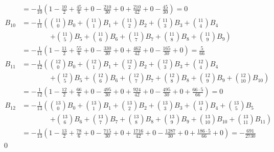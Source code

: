\documentclass[10pt]{amsart}
\theoremstyle{nonumberplain}
\begin{document}
\begin{enumerate}[label={\bf {\arabic*}:}]
\begin{enumerate}
\begin{align*}
	&= - \frac 1 {10} \left( 1 - \frac {10} 2 + \frac {45} 6 + 0 - \frac {210} {30} + 0 + \frac {210}{42} + 0 - \frac {45}{30} \right)
	= 0 \\
B_{10} &= - \frac 1 {11} \left(
		{11 \choose 0}B_0
		+  {11 \choose 1}B_1
		+ {11 \choose 2}B_2
		+ {11 \choose 3}B_3
		+ {11 \choose 4}B_4 \right. \\
		& \quad\quad\quad\quad\left. + {11 \choose 5}B_5
		+ {11 \choose 6}B_6
		+ {11 \choose 7}B_7
		+ {11 \choose 8}B_8
		+ {11 \choose 9}B_9
	\right) \\
	&= - \frac 1 {11} \left( 1 - \frac {11} 2 + \frac {55} 6 + 0 - \frac {330} {30} + 0 + \frac {462}{42} + 0 - \frac {165}{30} + 0\right)
	= \frac 5 {66} \\
B_{11} &= - \frac 1 {12} \left(
		{12 \choose 0}B_0
		+  {12 \choose 1}B_1
		+ {12 \choose 2}B_2
		+ {12 \choose 3}B_3
		+ {12 \choose 4}B_4 \right. \\
		& \quad\quad\quad\quad\left. + {12 \choose 5}B_5
		+ {12 \choose 6}B_6
		+ {12 \choose 7}B_7
		+ {12 \choose 8}B_8
		+ {12 \choose 9}B_9
		+ {12 \choose 10}B_{10}
	\right) \\
	&= - \frac 1 {12} \left( 1 - \frac {12} 2 + \frac {66} 6 + 0 - \frac {495} {30} + 0 + \frac {924}{42} + 0 - \frac {495}{30} + 0 + \frac {66\cdot5}{66} \right)
	= 0 \\
B_{12} &= - \frac 1 {13} \left(
		{13 \choose 0}B_0
		+  {13 \choose 1}B_1
		+ {13 \choose 2}B_2
		+ {13 \choose 3}B_3
		+ {13 \choose 4}B_4 
		+ {13 \choose 5}B_5\right. \\
		& \quad\quad\quad\quad\left. 
		+ {13 \choose 6}B_6
		+ {13 \choose 7}B_7
		+ {13 \choose 8}B_8
		+ {13 \choose 9}B_9
		+ {13 \choose 10}B_{10}
		+ {13 \choose 11}B_{11}
	\right) \\
	&= - \frac 1 {13} \left( 1 - \frac {13} 2 + \frac {78} 6 + 0 - \frac {715} {30} + 0 + \frac {1716}{42} + 0 - \frac {1287}{30} + 0 + \frac {186\cdot5}{66} + 0\right)
	= -\frac {691}{2730}
\end{align*}
\qed
\\



\end{enumerate}
\end{enumerate}
\end{document}
